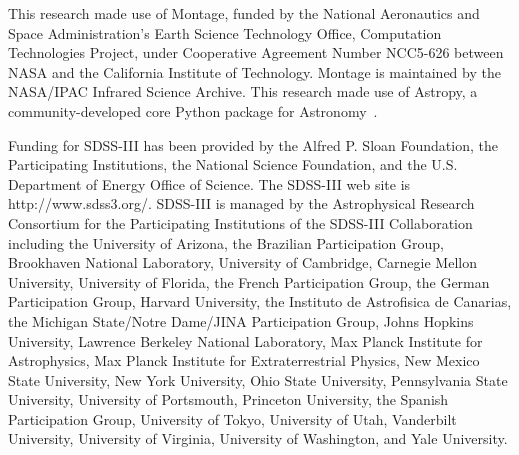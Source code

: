 \documentclass[authoryear, 12pt, 5p, times]{elsarticle}
\begin{document}
This research made use of Montage, funded by the National Aeronautics and Space Administration's Earth Science Technology Office, Computation Technologies Project, under Cooperative Agreement Number NCC5-626 between NASA and the California Institute of Technology. Montage is maintained by the NASA/IPAC Infrared Science Archive. This research made use of Astropy, a community-developed core Python package for Astronomy~\citep{astropy}.

Funding for SDSS-III has been provided by the Alfred P. Sloan Foundation, the Participating Institutions, the National Science Foundation, and the U.S. Department of Energy Office of Science. The SDSS-III web site is http://www.sdss3.org/. SDSS-III is managed by the Astrophysical Research Consortium for the Participating Institutions of the SDSS-III Collaboration including the University of Arizona, the Brazilian Participation Group, Brookhaven National Laboratory, University of Cambridge, Carnegie Mellon University, University of Florida, the French Participation Group, the German Participation Group, Harvard University, the Instituto de Astrofisica de Canarias, the Michigan State/Notre Dame/JINA Participation Group, Johns Hopkins University, Lawrence Berkeley National Laboratory, Max Planck Institute for Astrophysics, Max Planck Institute for Extraterrestrial Physics, New Mexico State University, New York University, Ohio State University, Pennsylvania State University, University of Portsmouth, Princeton University, the Spanish Participation Group, University of Tokyo, University of Utah, Vanderbilt University, University of Virginia, University of Washington, and Yale University.



\end{document}

